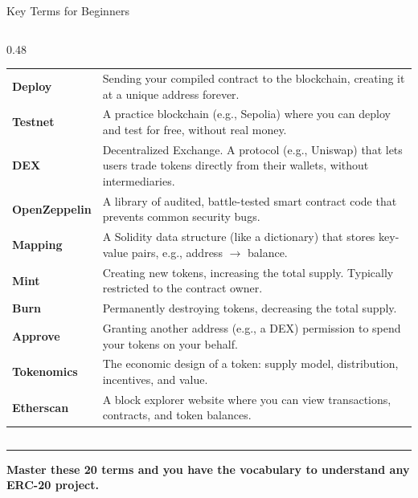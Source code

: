 \documentclass[8pt,aspectratio=169]{beamer}
\newcommand{\bottomnote}[1]{\vfill\vspace{-2mm}\textcolor{mllavender2}{\rule{\textwidth}{0.4pt}}\par\vspace{1mm}\footnotesize\textbf{#1}}
\begin{document}
\begin{frame}{Key Terms for Beginners}
\begin{columns}[T]
\begin{column}{0.48\linewidth}
{\begin{tabular}{@{}p{1.8cm}p{4.8cm}@{}}
\midrule
\textbf{Deploy} & Sending your compiled contract to the blockchain, creating it at a unique address forever. \\
\textbf{Testnet} & A practice blockchain (e.g., Sepolia) where you can deploy and test for free, without real money. \\
\textbf{DEX} & Decentralized Exchange. A protocol (e.g., Uniswap) that lets users trade tokens directly from their wallets, without intermediaries. \\
\textbf{OpenZeppelin} & A library of audited, battle-tested smart contract code that prevents common security bugs. \\
\textbf{Mapping} & A Solidity data structure (like a dictionary) that stores key-value pairs, e.g., address $\rightarrow$ balance. \\
\textbf{Mint} & Creating new tokens, increasing the total supply. Typically restricted to the contract owner. \\
\textbf{Burn} & Permanently destroying tokens, decreasing the total supply. \\
\textbf{Approve} & Granting another address (e.g., a DEX) permission to spend your tokens on your behalf. \\
\textbf{Tokenomics} & The economic design of a token: supply model, distribution, incentives, and value. \\
\textbf{Etherscan} & A block explorer website where you can view transactions, contracts, and token balances. \\
\bottomrule
\end{tabular}
}
\end{column}
\end{columns}

\bottomnote{Master these 20 terms and you have the vocabulary to understand any ERC-20 project.}
\end{frame}
\end{document}
